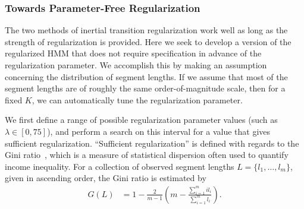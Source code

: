 \documentclass[12pt]{article}
\begin{document}
%
%

\subsubsection{Towards Parameter-Free Regularization}\label{sec:param-free}

The two methods of inertial transition regularization work well as long as the strength of regularization is provided. Here we seek to develop a version of the regularized HMM that does not require specification in advance of the regularization parameter. We accomplish this by making an assumption concerning the distribution of segment lengths. If we assume that most of the segment lengths are of roughly the same order-of-magnitude scale, then for a fixed $K$, we can automatically tune the regularization parameter.

We first define a range of possible regularization parameter values (such as $\lambda \in [0, 75]$), and perform a search on this interval for a value that gives sufficient regularization. ``Sufficient regularization'' is defined with regards to the Gini ratio~\cite{gini1936,wiki:1}, which is a measure of statistical dispersion often used to quantify income inequality. For a collection of observed segment lengths $L = \{l_1, \ldots, l_m\}$, given in ascending order, the Gini ratio is estimated by
\begin{align*}
    G(L) &= 1 - \frac{2}{m-1}\left(m - \frac{\sum_{i=1}^{m} i l_i}{\sum_{i=1}^{m} l_i}\right).
\end{align*}
\end{document}
